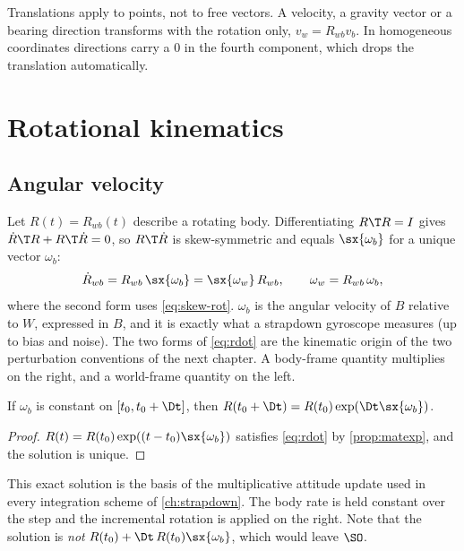 \begin{pitfall}
Translations apply to points, not to free vectors. A velocity, a gravity vector or a bearing direction
transforms with the rotation only, $v_w = R_{wb}v_b$. In homogeneous coordinates directions carry a $0$
in the fourth component, which drops the translation automatically.
\end{pitfall}

\section{Rotational kinematics}
\label{sec:rot-kinematics}

\subsection{Angular velocity}

Let $R(t) = R_{wb}(t)$ describe a rotating body. Differentiating $R\T R = I$ gives
$\dot R\T R + R\T\dot R = 0$, so $R\T\dot R$ is skew-symmetric and equals $\sx{\omega_b}$ for a unique
vector $\omega_b$:
\begin{equation}
  \dot R_{wb} = R_{wb}\,\sx{\omega_b} = \sx{\omega_w}\,R_{wb}, \qquad \omega_w = R_{wb}\,\omega_b ,
  \label{eq:rdot}
\end{equation}
where the second form uses \eqref{eq:skew-rot}. $\omega_b$ is the angular velocity of $B$ relative to
$W$, expressed in $B$, and it is exactly what a strapdown gyroscope measures (up to bias and noise).
The two forms of \eqref{eq:rdot} are the kinematic origin of the two perturbation conventions of the
next chapter. A body-frame quantity multiplies on the right, and a world-frame quantity on the left.

\begin{proposition}
\label{prop:const-rate}
If $\omega_b$ is constant on $[t_0, t_0 + \Dt]$, then $R(t_0 + \Dt) = R(t_0)\exp(\Dt\sx{\omega_b})$.
\end{proposition}
\begin{proof}
$R(t) = R(t_0)\exp((t - t_0)\sx{\omega_b})$ satisfies \eqref{eq:rdot} by \cref{prop:matexp}, and the
solution is unique.
\end{proof}

This exact solution is the basis of the multiplicative attitude update used in every integration
scheme of \cref{ch:strapdown}. The body rate is held constant over the step and the incremental
rotation is applied on the right. Note that the solution is \emph{not}
$R(t_0) + \Dt\, R(t_0)\sx{\omega_b}$, which would leave $\SO$.

